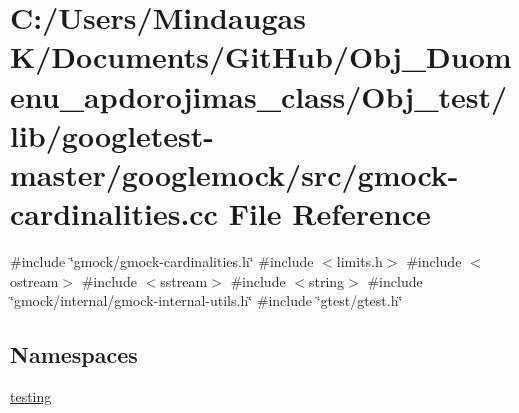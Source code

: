 \hypertarget{_obj__test_2lib_2googletest-master_2googlemock_2src_2gmock-cardinalities_8cc}{}\section{C\+:/\+Users/\+Mindaugas K/\+Documents/\+Git\+Hub/\+Obj\+\_\+\+Duomenu\+\_\+apdorojimas\+\_\+class/\+Obj\+\_\+test/lib/googletest-\/master/googlemock/src/gmock-\/cardinalities.cc File Reference}
\label{_obj__test_2lib_2googletest-master_2googlemock_2src_2gmock-cardinalities_8cc}
{\ttfamily \#include \char`\"{}gmock/gmock-\/cardinalities.\+h\char`\"{}}\newline
{\ttfamily \#include $<$limits.\+h$>$}\newline
{\ttfamily \#include $<$ostream$>$}\newline
{\ttfamily \#include $<$sstream$>$}\newline
{\ttfamily \#include $<$string$>$}\newline
{\ttfamily \#include \char`\"{}gmock/internal/gmock-\/internal-\/utils.\+h\char`\"{}}\newline
{\ttfamily \#include \char`\"{}gtest/gtest.\+h\char`\"{}}\newline
\subsection*{Namespaces}
\begin{DoxyCompactItemize}
\item 
 \mbox{\hyperlink{namespacetesting}{testing}}
\end{DoxyCompactItemize}
